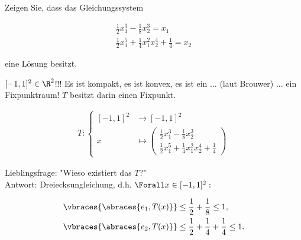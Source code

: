 \begin{exercise}

Zeigen Sie, dass das Gleichungssystem

\begin{align*}
  \frac{1}{2} x_1^3 - \frac{1}{8} x_2^3 = x_1 \\
  \frac{1}{2} x_1^5 + \frac{1}{4} x_1^2 x_2^4 + \frac{1}{4} = x_2
\end{align*}

eine Lösung besitzt.

\end{exercise}

\begin{solution}

$[-1, 1]^2 \in \R^2$!!! Es ist kompakt, es ist konvex, es ist ein ... (laut Brouwer) ... ein Fixpunktraum! $T$ besitzt darin einen Fixpunkt.

\begin{align*}
  T:
  \begin{cases}
    [-1, 1]^2 & \to [-1, 1]^2 \\
    x         & \mapsto
    \begin{pmatrix}
      \frac{1}{2} x_1^3 - \frac{1}{8} x_2^3 \\
      \frac{1}{2} x_1^5 + \frac{1}{4} x_1^2 x_2^4 + \frac{1}{4}
    \end{pmatrix}
  \end{cases}
\end{align*}

Lieblingsfrage: "Wieso existiert das $T$?" \\
Antwort: Dreiecksungleichung, d.h. $\Forall x \in [-1, 1]^2:$

\begin{align*}
  \vbraces{\abraces{e_1, T(x)}} & \leq
  \frac{1}{2} + \frac{1}{8} \leq
  1, \\
  \vbraces{\abraces{e_2, T(x)}} & \leq
  \frac{1}{2} + \frac{1}{4} + \frac{1}{4} \leq
  1.
\end{align*}

\end{solution}
